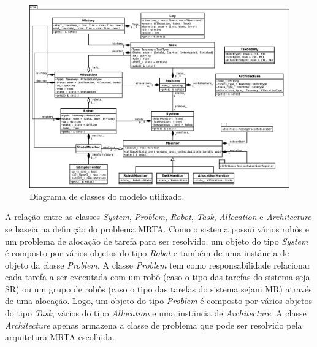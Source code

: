             \begin{figure}[htb]
                \centering
                \includegraphics[width=\textwidth]{Figuras/3_desenvolvimento/rqt_mrta_uml.eps}
                \caption{Diagrama de classes do modelo utilizado.} \label{fig:rqt_mrta_uml}
            \end{figure}
            
            A relação entre as classes \textit{System}, \textit{Problem}, \textit{Robot}, \textit{Task}, \textit{Allocation} e \textit{Architecture} se baseia na definição do problema MRTA. Como o sistema possui vários robôs e um problema de alocação de tarefa para ser resolvido, um objeto do tipo \textit{System} é composto por vários objetos do tipo \textit{Robot} e também de uma instância de objeto da classe \textit{Problem}. A classe \textit{Problem} tem como responsabilidade relacionar cada tarefa a ser executada com um robô (caso o tipo das tarefas do sistema seja SR) ou um grupo de robôs (caso o tipo das tarefas do sistema sejam MR) através de uma alocação. Logo, um objeto do tipo \textit{Problem} é composto por vários objetos do tipo \textit{Task}, vários do tipo \textit{Allocation} e uma instância de \textit{Architecture}. A classe \textit{Architecture} apenas armazena a classe de problema que pode ser resolvido pela arquitetura MRTA escolhida. 
            
